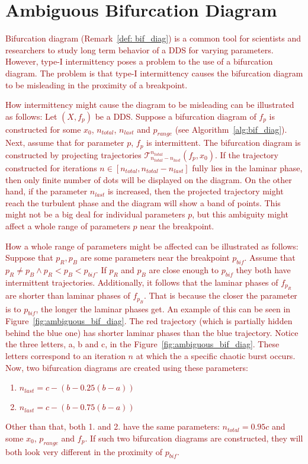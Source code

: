 \section{Ambiguous Bifurcation Diagram}
\label{sec:ambiguous_bif_diag}
\textcolor{darkred}{
Bifurcation diagram (Remark~\ref{def: bif_diag}) is a common tool for scientists and researchers to study long term behavior of a DDS for varying parameters.
However, type-I intermittency poses a problem to the use of a bifurcation diagram.
The problem is that type-I intermittency causes the bifurcation diagram to be misleading in the proximity of a breakpoint.
}
\par
\textcolor{darkred}{
How intermittency might cause the diagram to be misleading can be illustrated as follows:
Let $(X, f_{p})$ be a DDS.
Suppose a bifurcation diagram of $f_{p}$ is constructed for some $x_0$, $n_{total}$, $n_{last}$ and $p_{range}$ (see Algorithm~\ref{alg:bif_diag}).
Next, assume that for parameter $p$, $f_{p}$ is intermittent.
The bifurcation diagram is constructed by projecting trajectories $\mathcal{T}_{n_{total}-n_{last}}^{n_{total}}(f_{p}, x_0)$.
If the trajectory constructed for iterations $n \in [n_{total}, n_{total}-n_{last}]$ fully lies in the laminar phase, then only finite number of dots will be displayed on the diagram.
On the other hand, if the parameter $n_{last}$ is increased, then the projected trajectory might reach the turbulent phase and the diagram will show a band of points.
This might not be a big deal for individual parameters $p$, but this ambiguity might affect a whole range of parameters $p$ near the breakpoint.
}
\par
\textcolor{darkred}{
How a whole range of parameters might be affected can be illustrated as follows:
Suppose that $p_{R}, p_{B}$ are some parameters near the breakpoint $p_{bif}$.
Assume that $p_{R} \neq p_{B} \wedge p_{R} < p_{B} < p_{bif}$.
If $p_{R}$ and $p_{B}$ are close enough to $p_{bif}$ they both have intermittent trajectories.
Additionally, it follows that the laminar phases of $f_{p_{R}}$ are shorter than laminar phases of $f_{p_{B}}$.
That is because the closer the parameter is to $p_{bif}$, the longer the laminar phases get.
An example of this can be seen in Figure~\ref{fig:ambiguous_bif_diag}.
The red trajectory (which is partially hidden behind the blue one) has shorter laminar phases than the blue trajectory.
Notice the three letters, a, b and c, in the Figure~\ref{fig:ambiguous_bif_diag}.
These letters correspond to an iteration $n$ at which the a specific chaotic burst occurs.
Now, two bifurcation diagrams are created using these parameters:
\begin{enumerate}
    \item $n_{last} = c-(b-0.25(b-a))$
    \item $n_{last} = c-(b-0.75(b-a))$
\end{enumerate}
Other than that, both 1. and 2. have the same parameters: $n_{total} = 0.95c$ and some $x_0$, $p_{range}$ and $f_{p}$.
If such two bifurcation diagrams are constructed, they will both look very different in the proximity of $p_{bif}$.
}

